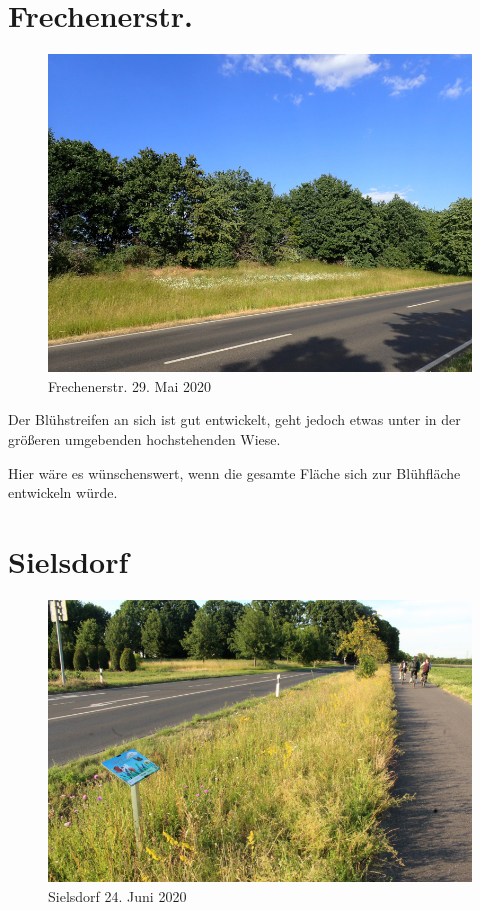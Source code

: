 \documentclass[10pt]{article}
\begin{document}
\section{Frechenerstr.}
\begin{figure}[h!]
  \includegraphics[width=\linewidth]{img/frechenerstr/mai.jpg}
  \caption{Frechenerstr. 29. Mai 2020}
\end{figure}

Der Blühstreifen an sich ist gut entwickelt, geht jedoch etwas unter in der größeren umgebenden hochstehenden Wiese.

Hier wäre es wünschenswert, wenn die gesamte Fläche sich zur Blühfläche entwickeln würde.

\clearpage
\section{Sielsdorf}
\begin{figure}[h!]
  \includegraphics[width=\linewidth]{img/sielsdorf/juni.jpg}
  \caption{Sielsdorf 24. Juni 2020}
\end{figure}
\end{document}
